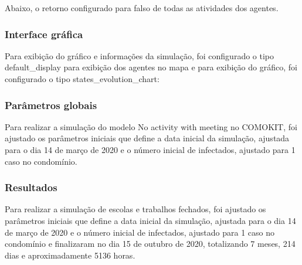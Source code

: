 
Abaixo, o retorno configurado para falso de todas as atividades dos agentes.



\subsubsection{Interface gráfica}

Para exibição do gráfico e informações da simulação, foi configurado o tipo default\_display para exibição dos agentes no mapa e para exibição do gráfico, foi configurado o tipo states\_evolution\_chart:



\subsubsection{Parâmetros globais}

Para realizar a simulação do modelo No activity with meeting no COMOKIT, foi ajustado os parâmetros iniciais que define a data inicial da simulação, ajustada para o dia 14 de março de 2020 e o número inicial de infectados, ajustado para 1 caso no condomínio.


\subsubsection{Resultados}

Para realizar a simulação de escolas e trabalhos fechados, foi ajustado os parâmetros iniciais que define a data inicial da simulação, ajustada para o dia 14 de março de 2020 e o número inicial de infectados, ajustado para 1 caso no condomínio e finalizaram no dia 15 de outubro de 2020, totalizando 7 meses, 214 dias e aproximadamente 5136 horas.




